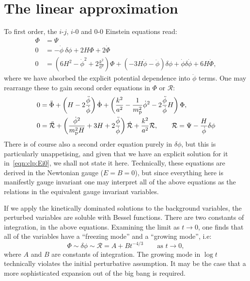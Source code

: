 \section{The linear approximation}
To first order, the $i$-$j$, $i$-$0$ and $0$-$0$ Einstein equations read:
\begin{align}
  \Phi &= \Psi 
  \label{eqn:clp:Eij} \\
  0 &= -\dot{\phi}\:\delta\phi  + 2 H \Phi + 2 \dot{\Phi} 
  \label{eqn:clp:Ei0}\\
  0 &= \left(6H^2-\dot{\phi}^2 + 2\frac{k^2}{a^2}\right)\Phi  + \left( -3H\dot{\phi} - \ddot{\phi} \right)\delta\phi + \dot{\phi}\delta\dot{\phi} +  6 H \dot{\Phi},
  \label{eqn:clp:E00}
\end{align}
where we have absorbed the explicit potential dependence into $\ddot{\phi}$ terms. 
One may rearrange these to gain second order equations in $\Phi$ or $\mathcal{R}$:
\begin{align}
  0 &= \ddot{\Phi} + \left( H - 2 \frac{\ddot{\phi}}{\dot{\phi}} \right) \dot{\Phi} + \left( \frac{k^2}{a^2}-\frac{1}{m_{\mathrm{p}}^2}\dot{\phi}^2 - 2\frac{\ddot{\phi}}{\dot{\phi}}H \right)\Phi, \\
  0 &= \ddot{\mathcal{R}} + \left( \frac{\dot{\phi}^2}{m_{\mathrm{p}}^2H} + 3H + 2\frac{\ddot{\phi}}{\dot{\phi}} \right)\dot{\mathcal{R}} + \frac{k^2}{a^2}\mathcal{R}, \qquad \mathcal{R} = \Psi - \frac{H}{\dot{\phi}}\delta\phi
\end{align}
There is of course also a second order equation purely in $\delta\phi$, but this is particularly unappetising, and given that we have an explicit solution for it in~\eqref{eqn:clp:Ei0}, we shall not state it here.
Technically, these equations are derived in the Newtonian gauge ($E=B=0$), but since everything here is manifestly gauge invariant one may interpret all of the above equations as the relations in the equivalent gauge invariant variables.

If we apply the kinetically dominated solutions to the background variables, the perturbed variables are soluble with Bessel functions. There are two constants of integration, in the above equations. Examining the limit as $t\to 0$, one finds that all of the variables have a ``freezing mode'' and a ``growing mode'', i.e:
\begin{equation}
  \Phi\sim \delta\phi \sim \mathcal{R} = A + B t^{-4/3} \qquad \text{as } t\rightarrow 0,
\end{equation}
where $A$ and $B$ are constants of integration.
The growing mode in $\log t$ technically violates the initial perturbative assumption. It may be the case that a more sophisticated expansion out of the big bang is required.

